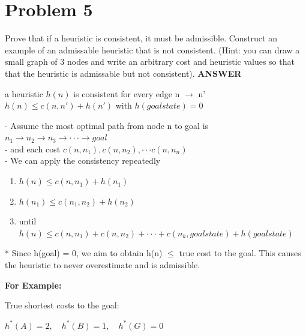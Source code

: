 \documentclass{article}
\begin{document}
\section*{Problem 5}
Prove that if a heuristic is consistent, it must be admissible. Construct an example of an admissable heuristic that is not consistent.
(Hint: you can draw a small graph of 3 nodes and write an arbitrary cost and heuristic values so that that the heuristic is admissable but not consistent).
\medskip
\textbf{ANSWER}\\

\begin{center}
   a heuristic $h(n)$ is consistent for every edge n $\rightarrow$ n'\\
   $h(n) \le c(n,n') + h(n')$ with $h(goal state) = 0$
\end{center}

- Assume the most optimal path from node n to goal is $n_1 \rightarrow n_2 \rightarrow n_3 \rightarrow \cdot\cdot\cdot \rightarrow goal$\\
- and each cost $c(n, n_1), c(n, n_2), \cdot\cdot\cdot c(n, n_n)$\\
- We can apply the consistency repeatedly 
\begin{enumerate}
   \item $h(n) \le c(n,n_1) + h(n_1)$
   \item $h(n_1) \le c(n_1,n_2) + h(n_2)$
   \item until $h(n) \le c(n,n_1) + c(n, n_2) + \cdot\cdot\cdot + c(n_k, goal state) + h(goal state)$
\end{enumerate}
* Since h(goal) = 0, we aim to obtain h(n) $\le$ true cost to the goal. This causes the heuristic to never overestimate and is admissible.

\textbf{For Example:}

\begin{center}

\end{center}

True shortest costs to the goal:

$h^*(A) = 2, \quad h^*(B) = 1, \quad h^*(G) = 0$
\end{document}
